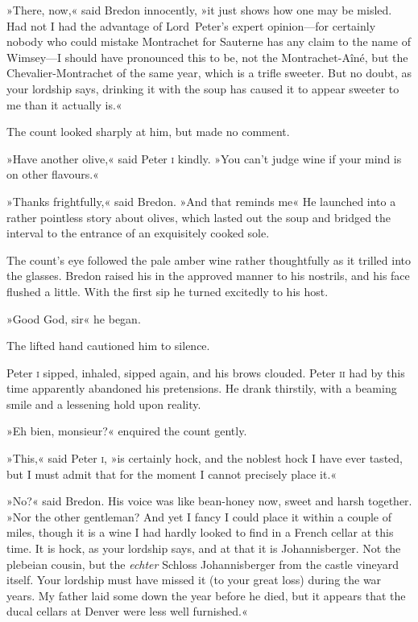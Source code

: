 »There, now,« said Bredon innocently, »it just shows how one may be misled. Had not I had the advantage of Lord~Peter's expert opinion—for certainly nobody who could mistake Montrachet for Sauterne has any claim to the name of Wimsey—I should have pronounced this to be, not the Montrachet-Aîné, but the Chevalier-Montrachet of the same year, which is a trifle sweeter. But no doubt, as your lordship says, drinking it with the soup has caused it to appear sweeter to me than it actually is.«

The count looked sharply at him, but made no comment.

»Have another olive,« said Peter \textsc{i} kindly. »You can't judge wine if your mind is on other flavours.«

»Thanks frightfully,« said Bredon. »And that reminds me\longdash« He launched into a rather pointless story about olives, which lasted out the soup and bridged the interval to the entrance of an exquisitely cooked sole.

The count's eye followed the pale amber wine rather thoughtfully as it trilled into the glasses. Bredon raised his in the approved manner to his nostrils, and his face flushed a little. With the first sip he turned excitedly to his host.

»Good God, sir\longdash« he began.

The lifted hand cautioned him to silence.

Peter \textsc{i} sipped, inhaled, sipped again, and his brows clouded. Peter \textsc{ii} had by this time apparently abandoned his pretensions. He drank thirstily, with a beaming smile and a lessening hold upon reality.

»Eh bien, monsieur?« enquired the count gently.

»This,« said Peter \textsc{i}, »is certainly hock, and the noblest hock I have ever tasted, but I must admit that for the moment I cannot precisely place it.«

»No?« said Bredon. His voice was like bean-honey now, sweet and harsh together. »Nor the other gentleman? And yet I fancy I could place it within a couple of miles, though it is a wine I had hardly looked to find in a French cellar at this time. It is hock, as your lordship says, and at that it is Johannisberger. Not the plebeian cousin, but the \textit{echter} Schloss Johannisberger from the castle vineyard itself. Your lordship must have missed it (to your great loss) during the war years. My father laid some down the year before he died, but it appears that the ducal cellars at Denver were less well furnished.«

